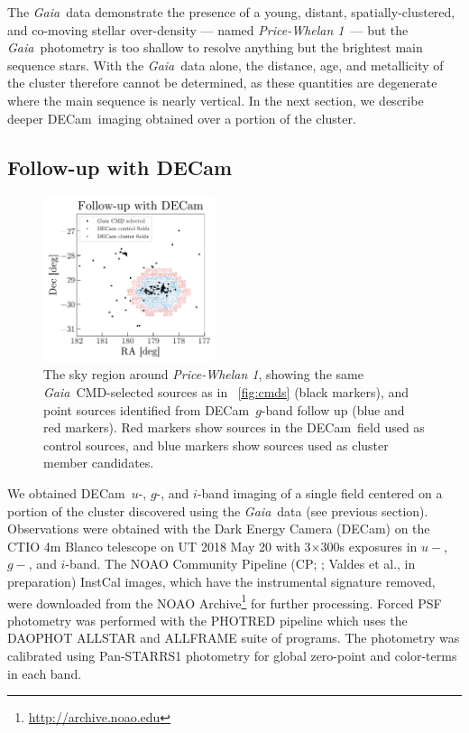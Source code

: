\documentclass[twocolumn]{aastex62}
\newcommand{\gaia}{\textsl{Gaia}}
\newcommand{\decam}{DECam}
\newcommand{\clustername}{\textsl{Price-Whelan 1}}
\begin{document}
The \gaia\ data demonstrate the presence of a young, distant, spatially-clustered, and co-moving stellar over-density --- named \clustername\ --- but the \gaia\ photometry is too shallow to resolve anything but the brightest main sequence stars.
With the \gaia\ data alone, the distance, age, and metallicity of the cluster therefore cannot be determined, as these quantities are degenerate where the main sequence is nearly vertical.
In the next section, we describe deeper \decam\ imaging obtained over a portion of the cluster.

\clearpage

\subsection{Follow-up with \decam}
\label{sec:decam}

\begin{figure}[t!]
\centering
\includegraphics[width=0.45\textwidth]{figures/DECam-field.pdf}
\caption{The sky region around \clustername, showing the same \gaia\ CMD-selected sources as in \figurename~\ref{fig:cmds} (black markers), and point sources identified from \decam\ $g$-band follow up (blue and red markers).
Red markers show sources in the \decam\ field used as control sources, and blue markers show sources used as cluster member candidates.}
\label{fig:decam-field}
\end{figure}

We obtained \decam\ $u$-, $g$-, and $i$-band imaging of a single field centered on a portion of the cluster discovered using the \gaia\ data (see previous section).  Observations were obtained with the Dark Energy Camera (DECam) on the CTIO 4m Blanco telescope on UT 2018 May 20 with 3$\times$300s
exposures in $u-$, $g-$, and $i$-band.  The NOAO Community Pipeline (CP; \citealt{Valdes:2014}; Valdes et al., in preparation) InstCal images, which have the instrumental signature removed, were downloaded from the NOAO Archive\footnote{\url{http://archive.noao.edu}} for further processing.  Forced PSF photometry was performed with the PHOTRED pipeline \citep{Nidever:2017} which uses the DAOPHOT ALLSTAR \citep{Stetson:1987} and ALLFRAME \citep{Stetson:1994} suite of programs.  The photometry was calibrated using Pan-STARRS1 \citep[PS1;][]{Chambers:2016} photometry for global zero-point and color-terms in each band.
\end{document}
